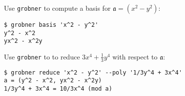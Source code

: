 \begin{example}
    Use \verb|grobner| to compute a basis for $\mathfrak{a}=(x^2 - y^2)$:
\begin{verbatim}
$ grobner basis 'x^2 - y^2'
y^2 - x^2
yx^2 - x^2y
\end{verbatim}

    \noindent
    Use \verb|grobner| to to reduce $3x^4 + \frac{1}{3} y^4$ with respect to
    $\mathfrak{a}$:
\begin{verbatim}
$ grobner reduce 'x^2 - y^2' --poly '1/3y^4 + 3x^4'
a = (y^2 - x^2, yx^2 - x^2y)
1/3y^4 + 3x^4 = 10/3x^4 (mod a)
\end{verbatim}    
\end{example}




